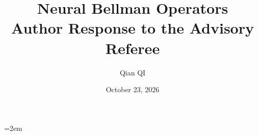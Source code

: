 \documentclass[11pt]{article}
\title{Neural Bellman Operators\\Author Response to the Advisory Referee}
\author{Qian QI}
\date{October 23, 2026}
\begin{document}
\emergencystretch=2em
\maketitle

\end{document}
